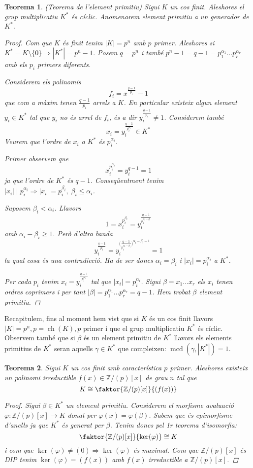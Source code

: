 \documentclass[a4paper,11pt]{report}
\DeclareMathOperator{\mcd}{mcd}
\newcommand{\ordre}[1]{|#1|}
\DeclareMathOperator{\ch}{ch}
\newcommand{\im}{\Rightarrow}
\theoremstyle{theorem}
\newtheorem{teorema}{\normalfont \sffamily\bfseries Teorema}[section]
\theoremstyle{definition}
\begin{document}
\begin{teorema} (Teorema de l'element primitiu)
	Sigui $K$ un cos finit. Aleshores el grup multiplicatiu $K^*$ és cíclic. Anomenarem element primitiu a un generador de $K^*$.
\begin{proof}
	Com que $K$ és finit tenim $\ordre{K}=p^n$ amb $p$ primer. Aleshores si $K^*=K\setminus\{0\}\im \ordre{K^*}=p^n-1$. Posem $q=p^n$ i també $p^n-1=q-1=p_1^{\alpha_1}\ldots p_r^{\alpha_r}$ amb els $p_i$ primers diferents.
	
	Considerem els polinomis $$f_i=x^{\tfrac{q-1}{p_i}}-1$$ que com a màxim tenen $\tfrac{q-1}{p_i}$ arrels a $K$. En particular existeix algun element $y_i\in K^*$ tal que $y_i$ no és arrel de $f_i$, és a dir $y_i^{\tfrac{q-1}{p_i}}\neq 1$. Considerem també$$x_i=y_i^{\tfrac{q-1}{p_i^{\alpha_i}}}\in K^*$$ Veurem que l'ordre de $x_i$ a $K^*$ és $p_i^{\alpha_i}$.
	
	Primer observem que $$x_i^{p_i^{\alpha_i}}=y_i^{q-1}=1$$ ja que l'ordre de $K^*$ és $q-1$. Conseqüentment tenim $\ordre{x_i}\mid p_i^{\alpha_i}\im \ordre{x_i}=p_i^{\beta_i},\;\beta_i\leq\alpha_i$.
	
	Suposem $\beta_i <\alpha_i$. Llavors $$1=x_i^{p_i^{\beta_i}}=y_i^{\tfrac{q-1}{p_i^{\alpha_i-\beta_i}}}$$ amb $\alpha_i-\beta_i\geq 1$. Però d'altra banda $$y_i^{\tfrac{q-1}{p_i}}=y_i^{\big(\tfrac{q-1}{p_i^{\alpha_i-\beta_i}}\big)^{\alpha_i-\beta_i-1}}=1$$ la qual cosa és una contradicció. Ha de ser doncs $\alpha_i=\beta_i$ i $\ordre{x_i}=p_i^{\alpha_i}$ a $K^*$.
	
	
	Per cada $p_i$ tenim $x_i=y_i^{\tfrac{q-1}{p_i^{\alpha_i}}}$ tal que $\ordre{x_i}=p_i^{\alpha_i}$. Sigui $\beta=x_1\ldots x_r$ els $x_i$ tenen ordres coprimers i per tant $\ordre{\beta}=p_1^{\alpha_1}\ldots p_r^{\alpha_r}=q-1$. Hem trobat $\beta$ element primitiu.
\end{proof}
\end{teorema}

Recapitulem, fins al moment hem vist que si $K$ és un cos finit llavors $\ordre{K}=p^n,p=\ch(K),p$ primer i que el grup multiplicatiu $K^*$ és cíclic. Observem també que si $\beta$ és un element primitiu de $K^*$ llavors els elements primitius de $K^*$ seran aquells $\gamma\in K^*$ que compleixen: $\mcd(\gamma,\ordre{K^*})=1$.

\begin{teorema}
	Sigui $K$ un cos finit amb característica $p$ primer. Aleshores existeix un polinomi irreductible $f(x)\in \mathbb{Z}/(p)[x]$ de grau $n$ tal que $$K\cong \faktor{\mathbb{Z}/(p) [x]}{(f(x))}
$$
\begin{proof}
	Sigui $\beta\in K^*$ un element primitiu. Considerem el morfisme avaluació $\varphi:\mathbb{Z}/(p)[x]\longrightarrow K$ donat per $\varphi(x)=\varphi(\beta)$. Sabem que és epimorfisme d'anells ja que $K^*$ és generat per $\beta$. Tenim doncs pel 1r teorema d'isomorfia: $$\faktor{\mathbb{Z}/(p)[x]}{\ker(\varphi)}\cong K$$ i com que $\ker(\varphi)\neq(0)\im \ker(\varphi)$ és maximal. Com que $\mathbb{Z}/(p)[x]$ és DIP tenim $\ker(\varphi)=(f(x))$ amb $f(x)$ irreductible a $\mathbb{Z}/(p)[x]$.
\end{proof}
\end{teorema}
\end{document}
